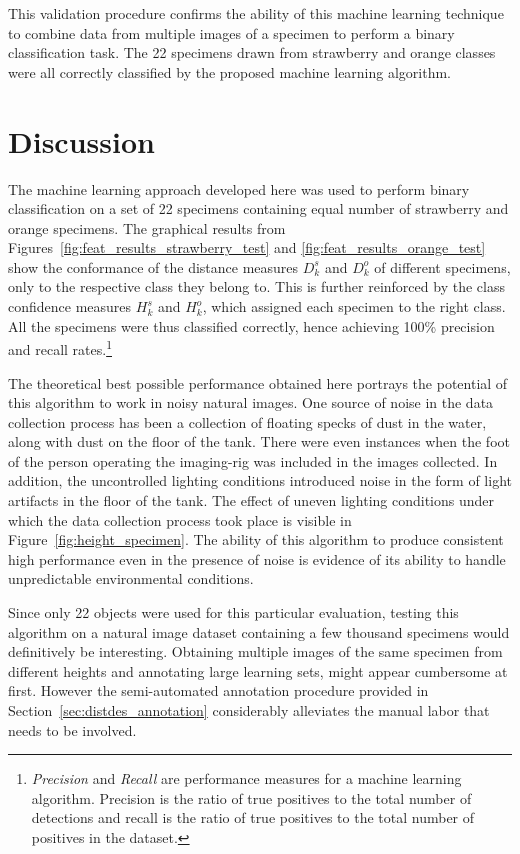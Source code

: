 This validation procedure confirms the ability of this machine learning technique to combine data from multiple images of a specimen to perform a binary classification task. The 22 specimens drawn from strawberry and orange classes were all correctly classified by the proposed machine learning algorithm.

\section{Discussion}

The machine learning approach developed here was used to perform binary classification on a set of 22 specimens containing equal number of strawberry and orange specimens. The graphical results from Figures~\ref{fig:feat_results_strawberry_test} and \ref{fig:feat_results_orange_test} show the conformance of the distance measures $D^s_k$ and $D^o_k$ of different specimens, only to the respective class they belong to. This is further reinforced by the class confidence measures $H^s_k$ and $H^o_k$, which assigned each specimen to the right class. All the specimens were thus classified correctly, hence achieving 100\% precision and recall rates.\footnote{\emph{Precision} and \emph{Recall} are performance measures for a machine learning algorithm. Precision is the ratio of true positives to the total number of detections and recall is the ratio of true positives to the total number of positives in the dataset.} 

The theoretical best possible performance obtained here portrays the potential of this algorithm to work in noisy natural images. One source of noise in the data collection process has been a collection of floating specks of dust in the water, along with dust on the floor of the tank. There were even instances when the foot of the person operating the imaging-rig was included in the images collected. In addition, the uncontrolled lighting conditions introduced noise in the form of light artifacts in the floor of the tank. The effect of uneven lighting conditions under which the data collection process took place is visible in Figure~\ref{fig:height_specimen}. The ability of this algorithm to produce consistent high performance even in the presence of noise is evidence of its ability to handle unpredictable environmental conditions.

Since only 22 objects were used for this particular evaluation, testing this algorithm on a natural image dataset containing a few thousand specimens would definitively be interesting. Obtaining multiple images of the same specimen from different heights and annotating large learning sets, might appear cumbersome at first. However the semi-automated annotation procedure provided in Section~\ref{sec:distdes_annotation} considerably alleviates the manual labor that needs to be involved.

